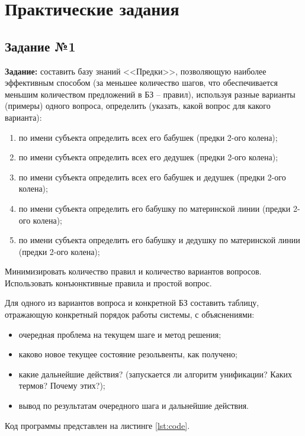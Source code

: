 \chapter{Практические задания}
\section{Задание №1}
\textbf{Задание:} составить базу знаний <<Предки>>, позволяющую наиболее эффективным способом (за меньшее количество шагов, что обеспечивается меньшим количеством предложений в БЗ -- правил), используя разные варианты (примеры) одного вопроса, определить (указать, какой вопрос для какого варианта):
\begin{enumerate}
	\item по имени субъекта определить всех его бабушек (предки 2-ого колена);
	\item по имени субъекта определить всех его дедушек (предки 2-ого колена);
	\item по имени субъекта определить всех его бабушек и дедушек (предки 2-ого колена);
	\item по имени субъекта определить его бабушку по материнской линии (предки 2-ого колена);
	\item по имени субъекта определить его бабушку и дедушку по материнской линии (предки 2-ого колена);
\end{enumerate}
Минимизировать количество правил и количество вариантов вопросов. Использовать конъюнктивные правила и простой вопрос.

Для одного из вариантов вопроса и конкретной БЗ составить таблицу, отражающую конкретный порядок работы системы, с объяснениями:
\begin{itemize}
	\item очередная проблема на текущем шаге и метод решения;
	\item каково новое текущее состояние резольвенты, как получено;
	\item какие дальнейшие действия? (запускается ли алгоритм унификации? Каких термов? Почему этих?);
	\item вывод по результатам очередного шага и дальнейшие действия.
\end{itemize}

Код программы представлен на листинге \ref{lst:code}.

